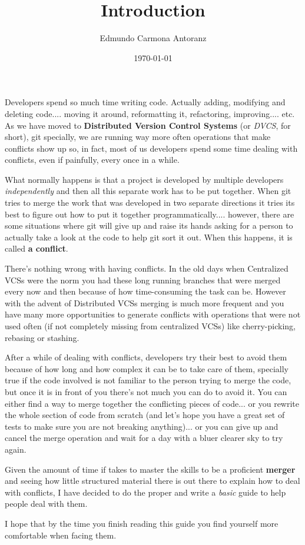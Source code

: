 \documentclass{article}
\title{Introduction}
\author{Edmundo Carmona Antoranz}
\date{\today}
\begin{document}
\maketitle

Developers spend so much time writing code. Actually adding, modifying and deleting code.... moving it around, reformatting it,
refactoring, improving.... etc. As we have moved to {\bf Distributed Version Control Systems} (or {\it DVCS}, for short), git
specially, we are running way more often operations that make conflicts show up so, in fact, most of us developers spend some
time dealing with conflicts, even if painfully, every once in a while.

What normally happens is that a project is developed by multiple developers {\it independently} and then all this separate work
has to be put together. When git tries to merge the work that was developed in two separate directions it tries its best to figure
out how to put it together programmatically.... however, there are some situations where git will give up and raise its hands asking
for a person to actually take a look at the code to help git sort it out. When this happens, it is called {\bf a conflict}.

There's nothing wrong with having conflicts. In the old days when Centralized VCSs were the norm you had these long running branches
that were merged every now and then because of how time-consuming the task can be. However with the advent of Distributed VCSs
merging is much more frequent and you have many more opportunities to generate conflicts with operations that were not used often
(if not completely missing from centralized VCSs) like cherry-picking, rebasing or stashing.

After a while of dealing with conflicts, developers try their best to avoid them because of how long and how complex it can be to
take care of them, specially true if the code involved is not familiar to the person trying to merge the code, but once it is in
front of you there's not much you can do to avoid it. You can either find a way to merge together the conflicting pieces of code...
or you rewrite the whole section of code from scratch (and let's hope you have a great set of tests to make sure you are not breaking
anything)... or you can give up and cancel the merge operation and wait for a day with a bluer clearer sky to try again.

Given the amount of time if takes to master the skills to be a proficient {\bf merger} and seeing how little structured material there
is out there to explain how to deal with conflicts, I have decided to do the proper and write a {\it basic} guide to help people deal
with them.

I hope that by the time you finish reading this guide you find yourself more comfortable when facing them.
\end{document}
